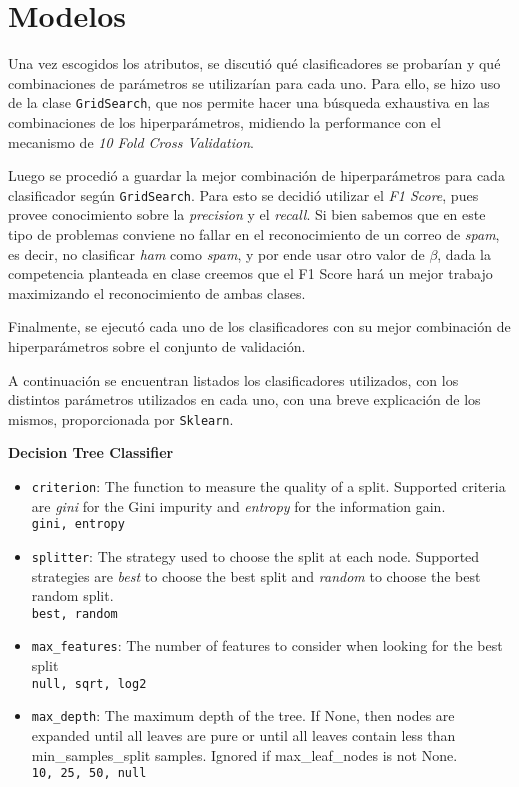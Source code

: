 \section{Modelos}

Una vez escogidos los atributos, se discutió qué clasificadores se probarían y qué combinaciones de parámetros se utilizar\'ian para cada uno. Para ello, se hizo uso de la clase \texttt{GridSearch}\textsuperscript{\cite{gridsearch}}, que nos permite hacer una b\'usqueda exhaustiva en las combinaciones de los hiperpar\'ametros, midiendo la performance con el mecanismo de \emph{10 Fold Cross Validation}.

Luego se procedió a guardar la mejor combinación de hiperparámetros para cada clasificador según \texttt{GridSearch}. Para esto se decidió utilizar el \emph{F1 Score}, pues provee conocimiento sobre la \emph{precision} y el \emph{recall}. Si bien sabemos que en este tipo de problemas conviene no fallar en el reconocimiento de un correo de \emph{spam}, es decir, no clasificar \emph{ham} como \emph{spam}, y por ende usar otro valor de $\beta$, dada la competencia planteada en clase creemos que el F1 Score hará un mejor trabajo maximizando el reconocimiento de ambas clases.

Finalmente, se ejecut\'o cada uno de los clasificadores con su mejor combinación de hiperparámetros sobre el conjunto de validación.

\noindent A continuaci\'on se encuentran listados los clasificadores utilizados, con los distintos par\'ametros utilizados en cada uno, con una breve explicaci\'on de los mismos, proporcionada por \texttt{Sklearn}.

\noindent \textbf{Decision Tree Classifier}
\begin{itemize}
	\item \texttt{criterion}: The function to measure the quality of a split. Supported criteria are \emph{gini} for the Gini impurity and \emph{entropy} for the information gain.\\
	\texttt{gini, entropy}
	\item \texttt{splitter}: The strategy used to choose the split at each node. Supported strategies are \emph{best} to choose the best split and \emph{random} to choose the best random split.\\
	\texttt{best, random}
	\item \texttt{max\_features}: The number of features to consider when looking for the best split\\
	\texttt{null, sqrt, log2}
	\item \texttt{max\_depth}: The maximum depth of the tree. If None, then nodes are expanded until all leaves are pure or until all leaves contain less than min\_samples\_split samples. Ignored if max\_leaf\_nodes is not None.\\
	\texttt{10, 25, 50, null}
\end{itemize}


